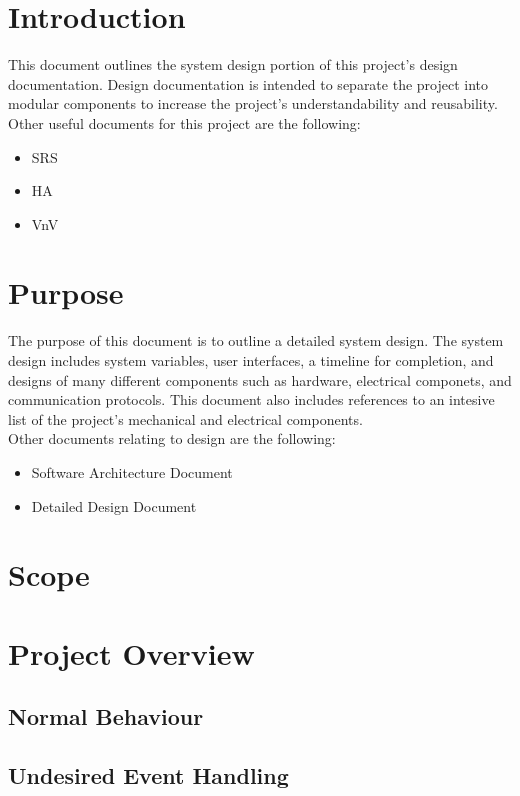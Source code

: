 \documentclass[12pt, titlepage]{article}
\begin{document}
\section{Introduction}
This document outlines the system design portion of this project's design documentation. Design documentation 
is intended to separate the project into modular components to increase the project's understandability and reusability. \\
Other useful documents for this project are the following:
\begin{itemize}
  \item SRS
  \item HA
  \item VnV
\end{itemize}

\section{Purpose}
The purpose of this document is to outline a detailed system design. The system design includes system variables, user interfaces, a timeline for completion, and designs of many 
different components such as hardware, electrical componets, and communication protocols. This document also includes references to an intesive list of the project's
mechanical and electrical components. \\
Other documents relating to design are the following:
\begin{itemize}
  \item Software Architecture Document
  \item Detailed Design Document
\end{itemize}
\section{Scope}


\section{Project Overview}

\subsection{Normal Behaviour}

\subsection{Undesired Event Handling}
\end{document}
